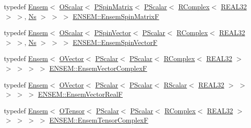 \begin{DoxyCompactItemize}
\item 
typedef \mbox{\hyperlink{classENSEM_1_1Ensem}{Ensem}}$<$ \mbox{\hyperlink{classENSEM_1_1OScalar}{O\+Scalar}}$<$ \mbox{\hyperlink{classENSEM_1_1PSpinMatrix}{P\+Spin\+Matrix}}$<$ \mbox{\hyperlink{classENSEM_1_1PScalar}{P\+Scalar}}$<$ \mbox{\hyperlink{classENSEM_1_1RComplex}{R\+Complex}}$<$ \mbox{\hyperlink{namespaceENSEM_a7540d01191172323e9073283d772576d}{R\+E\+A\+L32}} $>$ $>$, \mbox{\hyperlink{namespaceENSEM_a6f05e048f9b2eb1a19131074f8abc25f}{Ns}} $>$ $>$ $>$ \mbox{\hyperlink{group__defs_gaa172105da4407f0e7ee578ef2860789d}{E\+N\+S\+E\+M\+::\+Ensem\+Spin\+MatrixF}}
\item 
typedef \mbox{\hyperlink{classENSEM_1_1Ensem}{Ensem}}$<$ \mbox{\hyperlink{classENSEM_1_1OScalar}{O\+Scalar}}$<$ \mbox{\hyperlink{classENSEM_1_1PSpinVector}{P\+Spin\+Vector}}$<$ \mbox{\hyperlink{classENSEM_1_1PScalar}{P\+Scalar}}$<$ \mbox{\hyperlink{classENSEM_1_1RComplex}{R\+Complex}}$<$ \mbox{\hyperlink{namespaceENSEM_a7540d01191172323e9073283d772576d}{R\+E\+A\+L32}} $>$ $>$, \mbox{\hyperlink{namespaceENSEM_a6f05e048f9b2eb1a19131074f8abc25f}{Ns}} $>$ $>$ $>$ \mbox{\hyperlink{group__defs_ga6e77c99e4a59f258b6920dcdc7e8b011}{E\+N\+S\+E\+M\+::\+Ensem\+Spin\+VectorF}}
\item 
typedef \mbox{\hyperlink{classENSEM_1_1Ensem}{Ensem}}$<$ \mbox{\hyperlink{classENSEM_1_1OVector}{O\+Vector}}$<$ \mbox{\hyperlink{classENSEM_1_1PScalar}{P\+Scalar}}$<$ \mbox{\hyperlink{classENSEM_1_1PScalar}{P\+Scalar}}$<$ \mbox{\hyperlink{classENSEM_1_1RComplex}{R\+Complex}}$<$ \mbox{\hyperlink{namespaceENSEM_a7540d01191172323e9073283d772576d}{R\+E\+A\+L32}} $>$ $>$ $>$ $>$ $>$ \mbox{\hyperlink{group__defs_ga1e5f825ea470aefb26cfc8ac86b07aff}{E\+N\+S\+E\+M\+::\+Ensem\+Vector\+ComplexF}}
\item 
typedef \mbox{\hyperlink{classENSEM_1_1Ensem}{Ensem}}$<$ \mbox{\hyperlink{classENSEM_1_1OVector}{O\+Vector}}$<$ \mbox{\hyperlink{classENSEM_1_1PScalar}{P\+Scalar}}$<$ \mbox{\hyperlink{classENSEM_1_1PScalar}{P\+Scalar}}$<$ \mbox{\hyperlink{classENSEM_1_1RScalar}{R\+Scalar}}$<$ \mbox{\hyperlink{namespaceENSEM_a7540d01191172323e9073283d772576d}{R\+E\+A\+L32}} $>$ $>$ $>$ $>$ $>$ \mbox{\hyperlink{group__defs_ga3a76e6a8a956cba16fc997a3e86fd24b}{E\+N\+S\+E\+M\+::\+Ensem\+Vector\+RealF}}
\item 
typedef \mbox{\hyperlink{classENSEM_1_1Ensem}{Ensem}}$<$ \mbox{\hyperlink{classENSEM_1_1OTensor}{O\+Tensor}}$<$ \mbox{\hyperlink{classENSEM_1_1PScalar}{P\+Scalar}}$<$ \mbox{\hyperlink{classENSEM_1_1PScalar}{P\+Scalar}}$<$ \mbox{\hyperlink{classENSEM_1_1RComplex}{R\+Complex}}$<$ \mbox{\hyperlink{namespaceENSEM_a7540d01191172323e9073283d772576d}{R\+E\+A\+L32}} $>$ $>$ $>$ $>$ $>$ \mbox{\hyperlink{group__defs_ga0db22e9868127d6f3c8d522dd70aea59}{E\+N\+S\+E\+M\+::\+Ensem\+Tensor\+ComplexF}}

\end{DoxyCompactItemize}
